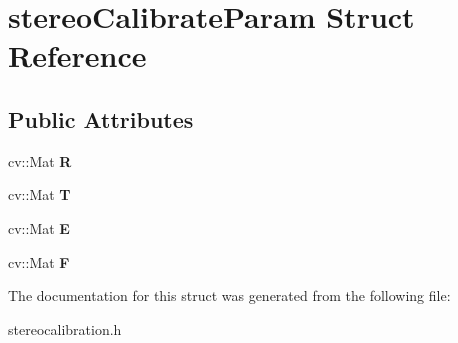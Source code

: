 \hypertarget{structstereo_calibrate_param}{}\section{stereo\+Calibrate\+Param Struct Reference}
\label{structstereo_calibrate_param}
\subsection*{Public Attributes}
\begin{DoxyCompactItemize}
\item 
\mbox{\label{structstereo_calibrate_param_a296969c4d4f7ec000be2049fce430ab9}} 
cv\+::\+Mat {\bfseries R}
\item 
\mbox{\label{structstereo_calibrate_param_a4b60d558e1e161a6d2fffda01db2f44c}} 
cv\+::\+Mat {\bfseries T}
\item 
\mbox{\label{structstereo_calibrate_param_ac64c0b57fcc1c2ebf20ad8d726f5b210}} 
cv\+::\+Mat {\bfseries E}
\item 
\mbox{\label{structstereo_calibrate_param_a38be7065c9583c4ed746c8eed4305bc1}} 
cv\+::\+Mat {\bfseries F}
\end{DoxyCompactItemize}


The documentation for this struct was generated from the following file\+:\begin{DoxyCompactItemize}
\item 
stereocalibration.\+h\end{DoxyCompactItemize}
